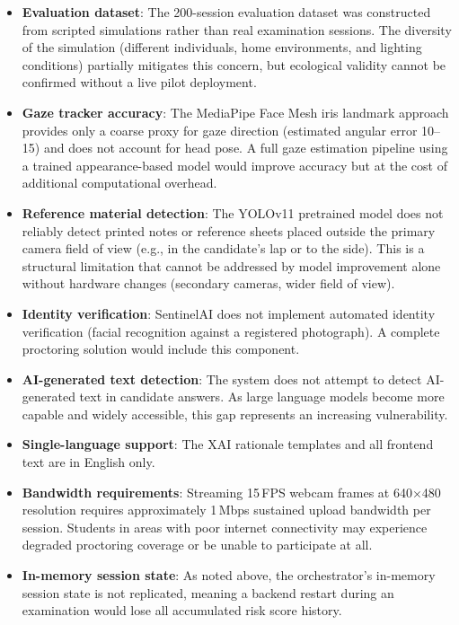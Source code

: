 \begin{itemize}
    \item \textbf{Evaluation dataset}: The 200-session evaluation dataset was constructed from scripted simulations rather than real examination sessions. The diversity of the simulation (different individuals, home environments, and lighting conditions) partially mitigates this concern, but ecological validity cannot be confirmed without a live pilot deployment.
    \item \textbf{Gaze tracker accuracy}: The MediaPipe Face Mesh iris landmark approach provides only a coarse proxy for gaze direction (estimated angular error 10--15\textdegree) and does not account for head pose. A full gaze estimation pipeline using a trained appearance-based model would improve accuracy but at the cost of additional computational overhead.
    \item \textbf{Reference material detection}: The YOLOv11 pretrained model does not reliably detect printed notes or reference sheets placed outside the primary camera field of view (e.g., in the candidate's lap or to the side). This is a structural limitation that cannot be addressed by model improvement alone without hardware changes (secondary cameras, wider field of view).
    \item \textbf{Identity verification}: SentinelAI does not implement automated identity verification (facial recognition against a registered photograph). A complete proctoring solution would include this component.
    \item \textbf{AI-generated text detection}: The system does not attempt to detect AI-generated text in candidate answers. As large language models become more capable and widely accessible, this gap represents an increasing vulnerability.
    \item \textbf{Single-language support}: The XAI rationale templates and all frontend text are in English only.
    \item \textbf{Bandwidth requirements}: Streaming 15\,FPS webcam frames at 640$\times$480 resolution requires approximately 1\,Mbps sustained upload bandwidth per session. Students in areas with poor internet connectivity may experience degraded proctoring coverage or be unable to participate at all.
    \item \textbf{In-memory session state}: As noted above, the orchestrator's in-memory session state is not replicated, meaning a backend restart during an examination would lose all accumulated risk score history.
\end{itemize}

